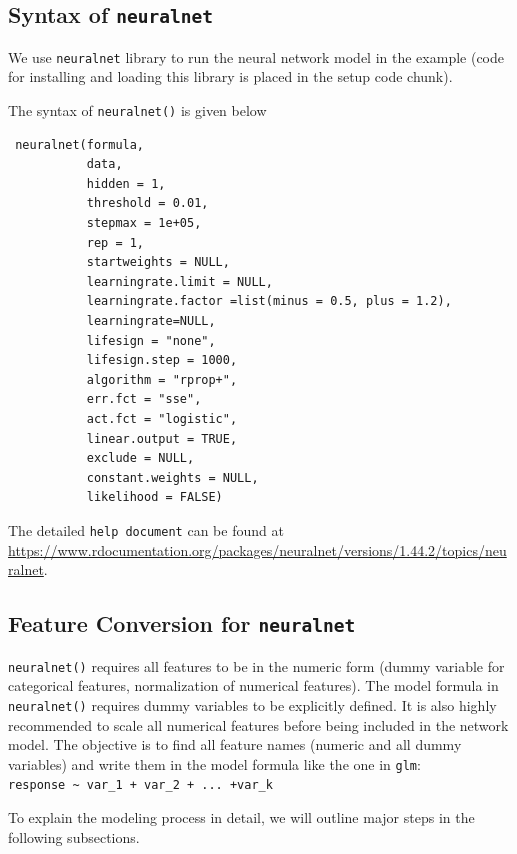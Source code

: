 \documentclass[
]{book}
\begin{document}
\hypertarget{syntax-of-neuralnet}{%
\subsection{\texorpdfstring{Syntax of \texttt{neuralnet}}{Syntax of neuralnet}}\label{syntax-of-neuralnet}}

We use \texttt{neuralnet} library to run the neural network model in the example (code for installing and loading this library is placed in the setup code chunk).

The syntax of \texttt{neuralnet()} is given below

\begin{verbatim}
 neuralnet(formula, 
           data, 
           hidden = 1,
           threshold = 0.01, 
           stepmax = 1e+05, 
           rep = 1, 
           startweights = NULL,
           learningrate.limit = NULL,
           learningrate.factor =list(minus = 0.5, plus = 1.2),
           learningrate=NULL, 
           lifesign = "none",
           lifesign.step = 1000, 
           algorithm = "rprop+",
           err.fct = "sse", 
           act.fct = "logistic",
           linear.output = TRUE, 
           exclude = NULL,
           constant.weights = NULL, 
           likelihood = FALSE)
\end{verbatim}

The detailed \texttt{help\ document} can be found at \url{https://www.rdocumentation.org/packages/neuralnet/versions/1.44.2/topics/neuralnet}.

\hypertarget{feature-conversion-for-neuralnet}{%
\subsection{\texorpdfstring{Feature Conversion for \texttt{neuralnet}}{Feature Conversion for neuralnet}}\label{feature-conversion-for-neuralnet}}

\texttt{neuralnet()} requires all features to be in the numeric form (dummy variable for categorical features, normalization of numerical features). The model formula in \texttt{neuralnet()} requires dummy variables to be explicitly defined. It is also highly recommended to scale all numerical features before being included in the network model. The objective is to find all feature names (numeric and all dummy variables) and write them in the model formula like the one in \texttt{glm}: \texttt{response\ \textasciitilde{}\ var\_1\ +\ var\_2\ +\ ...\ +var\_k}

To explain the modeling process in detail, we will outline major steps in the following subsections.
\end{document}
